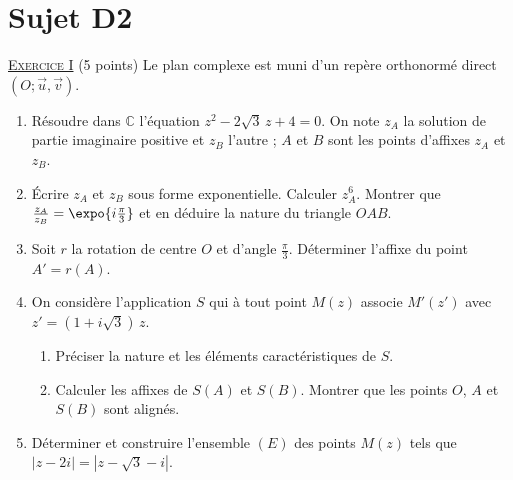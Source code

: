 \section{Sujet D2}
\noindent \underline{\textsc{Exercice I}} (5 points) \newline
Le plan complexe est muni d'un rep\`ere orthonorm\'e direct $(O ; \vec{u}, \vec{v})$.
\begin{enumerate}
      \item R\'esoudre dans $\mathbb{C}$ l'\'equation $z^2 - 2\sqrt{3}\,z + 4 = 0$.
            On note $z_A$ la solution de partie imaginaire positive et $z_B$ l'autre ; $A$ et $B$ sont les points d'affixes $z_A$ et $z_B$.
      \item \'Ecrire $z_A$ et $z_B$ sous forme exponentielle. Calculer $z_A^6$.
            Montrer que $\frac{z_A}{z_B} = \expo{i\frac{\pi}{3}}$ et en d\'eduire la nature du triangle $OAB$.
      \item Soit $r$ la rotation de centre $O$ et d'angle $\frac{\pi}{3}$. D\'eterminer l'affixe du point $A' = r(A)$.
      \item On consid\`ere l'application $S$ qui \`a tout point $M(z)$ associe $M'(z')$ avec $z' = (1 + i\sqrt{3})\,z$.
            \begin{enumerate}
            \item Pr\'eciser la nature et les \'el\'ements caract\'eristiques de $S$.
            \item Calculer les affixes de $S(A)$ et $S(B)$. Montrer que les points $O$, $A$ et $S(B)$ sont align\'es.
            \end{enumerate}
      \item D\'eterminer et construire l'ensemble $(E)$ des points $M(z)$ tels que $|z - 2i| = |z - \sqrt{3} - i|$.
\end{enumerate}

